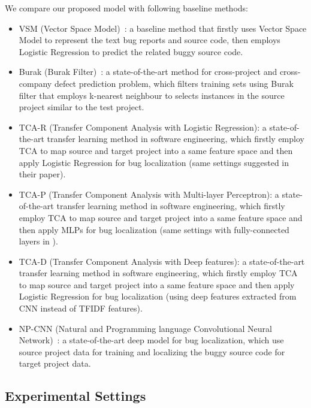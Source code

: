 We compare our proposed model \TRANPCNN with following baseline methods:
\begin{itemize}
  \item VSM (Vector Space Model)~\cite{rao2011retrieval}: a baseline method that firstly uses Vector Space Model to represent the text bug reports and source code, then employs Logistic Regression to predict the related buggy source code.
  \item Burak (Burak Filter)~\cite{peters2013better}: a state-of-the-art method for cross-project and cross-company defect prediction problem, which filters training sets using Burak filter that employs k-nearest neighbour to selects instances in the source project similar to the test project.
  \item TCA-R (Transfer Component Analysis with Logistic Regression): a state-of-the-art transfer learning method in software engineering, which firstly employ TCA to map source and target project into a same feature space and then apply Logistic Regression for bug localization (same settings suggested in their paper).
  \item TCA-P (Transfer Component Analysis with Multi-layer Perceptron): a state-of-the-art transfer learning method in software engineering, which firstly employ TCA to map source and target project into a same feature space and then apply MLPs for bug localization (same settings with fully-connected layers in \TRANPCNN).
   \item TCA-D (Transfer Component Analysis with Deep features): a state-of-the-art transfer learning method in software engineering, which firstly employ TCA to map source and target project into a same feature space and then apply Logistic Regression for bug localization (using deep features extracted from CNN instead of TFIDF features).
  \item NP-CNN (Natural and Programming language Convolutional Neural Network)~\cite{huo2016learning}: a state-of-the-art deep model for bug localization, which use source project data for training and localizing the buggy source code for target project data.
\end{itemize}

\subsection{Experimental Settings}

